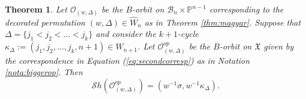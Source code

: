 \documentclass[12pt]{amsart}
\numberwithin{equation}{section}
\newtheorem{thm}{Theorem}[section]
\newcommand{\cW}{{ W}}
\newcommand{\B}{\mathcal{B}}
\newcommand{\Sh}{\mathcal{S}h}
\begin{document}
\begin{thm}\label{thm:globalSh}
Let $\mathcal{O}_{(w,\Delta)} $ be the $B$-orbit on $\B_{n}\times \mathbb{P}^{n-1}$ corresponding to the decorated permutation $(w,\Delta)\in\widehat{W}_{n}$ as in Theorem \ref{thm:magyar}.  Suppose that $\Delta=\{j_{1}<j_{2}<\dots<j_{k}\}$ and consider the $k+1$-cycle $\kappa_{\Delta}:=(j_{1}, j_{2},\dots, j_{k}, n+1)\in \cW_{n+1}$.  Let $\mathcal{O}_{(w,\Delta)}^{op}$ be the $B$-orbit on $\mathfrak{X}$ given by the correspondence in Equation (\ref{eq:secondcorresp}) as in Notation \ref{nota:biggerop}. Then 
\begin{equation}\label{eq:globalSh}
\Sh(\mathcal{O}_{(w,\Delta)}^{op})=(w^{-1}\sigma, w^{-1}\kappa_{\Delta}).  
\end{equation}
\end{thm}
\end{document}
